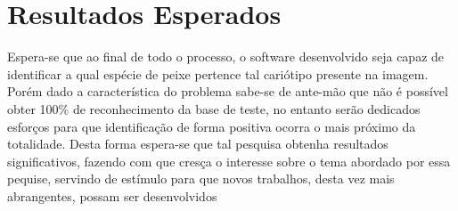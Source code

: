 \chapter{Resultados Esperados}

Espera-se que ao final de todo o processo, o software desenvolvido seja capaz de identificar a qual espécie de peixe pertence tal cariótipo presente na imagem. Porém dado a característica do problema sabe-se de ante-mão que não é possível obter 100\% de reconhecimento da base de teste, no entanto serão dedicados esforços para que identificação de forma positiva ocorra o mais próximo da totalidade. Desta forma espera-se que tal pesquisa obtenha resultados significativos, fazendo com que cresça o interesse sobre o tema abordado por essa pequise, servindo de estímulo para que novos trabalhos, desta vez mais abrangentes, possam ser desenvolvidos